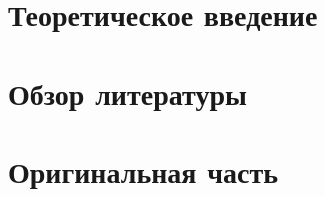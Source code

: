 \documentclass[diploma]{nanolab2015}
\begin{document}
\sloppy



\newpage

\tableofcontents

\newpage
{}


\newpage
\chapter{Теоретическое введение}


\newpage
\chapter{Обзор литературы}


\newpage
\chapter{Оригинальная часть}


\newpage
{}


\newpage



\end{document}
